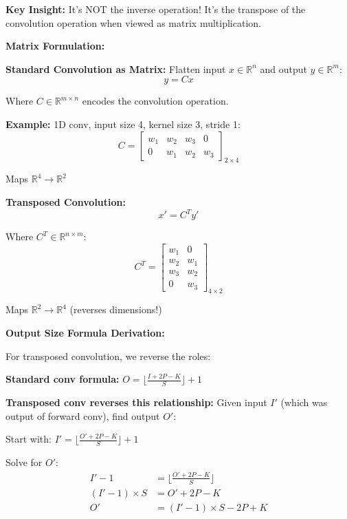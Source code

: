 \documentclass[12pt]{article}
\newcommand{\explanation}[1]{{\color{explanationcolor}#1}}
\begin{document}
\begin{enumerate}[(a)]
{{    \textbf{Key Insight:}
    It's NOT the inverse operation! It's the transpose of the convolution operation when viewed as matrix multiplication.
    }
    
    \textbf{Matrix Formulation:}
    
    \explanation{
    \textbf{Standard Convolution as Matrix:}
    Flatten input $x \in \mathbb{R}^n$ and output $y \in \mathbb{R}^m$:
    \[y = Cx\]
    
    Where $C \in \mathbb{R}^{m \times n}$ encodes the convolution operation.
    
    \textbf{Example:} 1D conv, input size 4, kernel size 3, stride 1:
    \[
    C = \begin{bmatrix}
    w_1 & w_2 & w_3 & 0 \\
    0 & w_1 & w_2 & w_3
    \end{bmatrix}_{2 \times 4}
    \]
    
    Maps $\mathbb{R}^4 \rightarrow \mathbb{R}^2$
    
    \textbf{Transposed Convolution:}
    \[x' = C^T y'\]
    
    Where $C^T \in \mathbb{R}^{n \times m}$:
    \[
    C^T = \begin{bmatrix}
    w_1 & 0 \\
    w_2 & w_1 \\
    w_3 & w_2 \\
    0 & w_3
    \end{bmatrix}_{4 \times 2}
    \]
    
    Maps $\mathbb{R}^2 \rightarrow \mathbb{R}^4$ (reverses dimensions!)
    }
    
    \textbf{Output Size Formula Derivation:}
    
    \explanation{
    For transposed convolution, we reverse the roles:
    
    \textbf{Standard conv formula:}
    $O = \lfloor\frac{I + 2P - K}{S}\rfloor + 1$
    
    \textbf{Transposed conv reverses this relationship:}
    Given input $I'$ (which was output of forward conv), find output $O'$:
    
    Start with: $I' = \lfloor\frac{O' + 2P - K}{S}\rfloor + 1$
    
    Solve for $O'$:
    \begin{align}
    I' - 1 &= \lfloor\frac{O' + 2P - K}{S}\rfloor\\
    (I' - 1) \times S &= O' + 2P - K\\
    O' &= (I' - 1) \times S - 2P + K
    \end{align}
    
}}
\end{enumerate}
\end{document}
